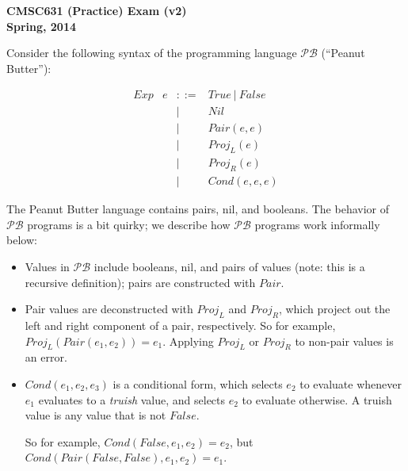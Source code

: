\documentclass[11pt]{article}
\newcommand\mexp{e}
\newcommand\True{\mathit{True}}
\newcommand\False{\mathit{False}}
\newcommand\Plang{\mathcal{PB}}
\begin{document}
\begin{center}
{\bf CMSC631 (Practice) Exam (v2)}\\
{\bf Spring, 2014}
\end{center}


\def\ExerciseName{Problem}

Consider the following syntax of the programming language $\Plang$ (``Peanut Butter''):

\newcommand\Cons{\mathit{Pair}}
\newcommand\Nil{\mathit{Nil}}
\newcommand\IsNil{\mathit{IsNil}}
\newcommand\ProjL{\mathit{Proj_L}}
\newcommand\ProjR{\mathit{Proj_R}}
\newcommand\Cond{\mathit{Cond}}
\newcommand\List{\mathit{List}}

\[
\begin{array}{lrcll}
 \mathit{Exp} 
               & e & ::= & \True\ |\ \False\\
               &   & |   & \Nil\\
               &   & |   & \Cons(\mexp,\mexp)\\
               &   & |   & \ProjL(e)\\
               &   & |   & \ProjR(e)\\
               &   & |   & \Cond(e,e,e)
\end{array}
\]

The Peanut Butter language contains pairs, nil, and booleans.  The behavior
of $\Plang$ programs is a bit quirky; we describe how $\Plang$
programs work informally below:

\begin{itemize}
\item Values in $\Plang$ include booleans, nil, and pairs of values
  (note: this is a recursive definition); pairs are constructed with
  $\Cons$.

\item Pair values are deconstructed with $\ProjL$ and $\ProjR$, which
  project out the left and right component of a pair, respectively.
  So for example, $\ProjL(\Cons(\mexp_1,\mexp_2)) = \mexp_1$.
  Applying $\ProjL$ or $\ProjR$ to non-pair values is an error.

\item $\Cond(\mexp_1,\mexp_2,\mexp_3)$ is a conditional form, which
  selects $\mexp_2$ to evaluate whenever $\mexp_1$ evaluates to a
  \emph{truish} value, and selects $\mexp_2$ to evaluate otherwise.  A
  truish value is any value that is not $\False$.

  So for example, $\Cond(\False, \mexp_1, \mexp_2) = \mexp_2$, but
  $\Cond(\Cons(\False,\False),\mexp_1,\mexp_2) = \mexp_1$.
\end{itemize}
\end{document}

